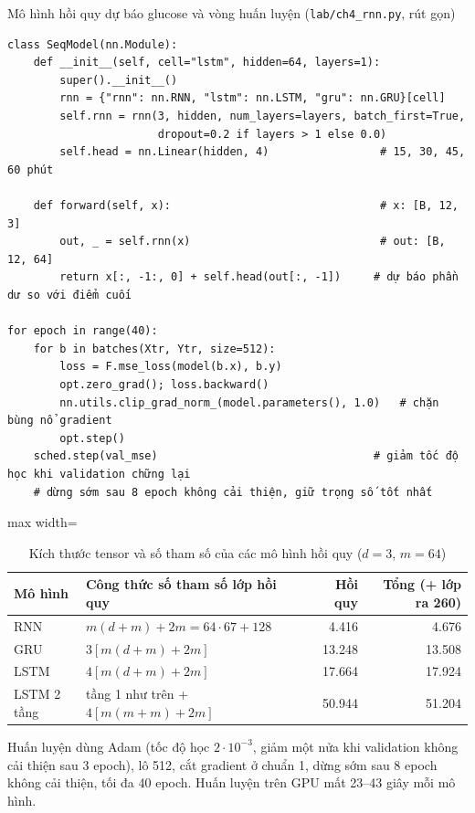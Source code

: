 \begin{code}{Mô hình hồi quy dự báo glucose và vòng huấn luyện (\texttt{lab/ch4\_rnn.py}, rút gọn)}
\label{lst:ch4-model}
\begin{verbatim}
class SeqModel(nn.Module):
    def __init__(self, cell="lstm", hidden=64, layers=1):
        super().__init__()
        rnn = {"rnn": nn.RNN, "lstm": nn.LSTM, "gru": nn.GRU}[cell]
        self.rnn = rnn(3, hidden, num_layers=layers, batch_first=True,
                       dropout=0.2 if layers > 1 else 0.0)
        self.head = nn.Linear(hidden, 4)                 # 15, 30, 45, 60 phút

    def forward(self, x):                                # x: [B, 12, 3]
        out, _ = self.rnn(x)                             # out: [B, 12, 64]
        return x[:, -1:, 0] + self.head(out[:, -1])     # dự báo phần dư so với điểm cuối

for epoch in range(40):
    for b in batches(Xtr, Ytr, size=512):
        loss = F.mse_loss(model(b.x), b.y)
        opt.zero_grad(); loss.backward()
        nn.utils.clip_grad_norm_(model.parameters(), 1.0)   # chặn bùng nổ gradient
        opt.step()
    sched.step(val_mse)                                 # giảm tốc độ học khi validation chững lại
    # dừng sớm sau 8 epoch không cải thiện, giữ trọng số tốt nhất
\end{verbatim}
\end{code}

\begin{table}[H]
\centering
\caption{Kích thước tensor và số tham số của các mô hình hồi quy ($d=3$, $m=64$)}
\label{tab:rnn-params}
\small
\begin{adjustbox}{max width=\linewidth}
\begin{tabular}{@{}llrr@{}}
\toprule
\textbf{Mô hình} & \textbf{Công thức số tham số lớp hồi quy} & \textbf{Hồi quy} & \textbf{Tổng (+ lớp ra 260)} \\
\midrule
RNN & $m(d+m) + 2m = 64\cdot67 + 128$ & 4.416 & 4.676 \\
GRU & $3[m(d+m)+2m]$ & 13.248 & 13.508 \\
LSTM & $4[m(d+m)+2m]$ & 17.664 & 17.924 \\
LSTM 2 tầng & tầng 1 như trên + $4[m(m+m)+2m]$ & 50.944 & 51.204 \\
\bottomrule
\end{tabular}
\end{adjustbox}
\end{table}

Huấn luyện dùng Adam (tốc độ học $2\cdot10^{-3}$, giảm một nửa khi validation không cải thiện sau 3 epoch), lô 512, cắt gradient ở chuẩn 1, dừng sớm sau 8 epoch không cải thiện, tối đa 40 epoch. Huấn luyện trên GPU mất 23–43 giây mỗi mô hình.

